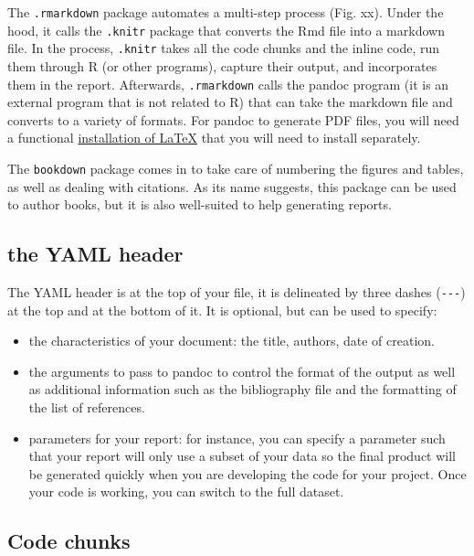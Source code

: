 \documentclass[
]{book}
\providecommand{\tightlist}{%
  \setlength{\itemsep}{0pt}\setlength{\parskip}{0pt}}
\begin{document}
The \texttt{.rmarkdown} package automates a multi-step process (Fig. xx). Under the hood, it calls the \texttt{.knitr} package that converts the Rmd file into a markdown file. In the process, \texttt{.knitr} takes all the code chunks and the inline code, run them through R (or other programs), capture their output, and incorporates them in the report. Afterwards, \texttt{.rmarkdown} calls the pandoc program (it is an external program that is not related to R) that can take the markdown file and converts to a variety of formats. For pandoc to generate PDF files, you will need a functional \href{https://www.latex-project.org/get/}{installation of LaTeX} that you will need to install separately.

The \texttt{bookdown} package comes in to take care of numbering the figures and tables, as well as dealing with citations. As its name suggests, this package can be used to author books, but it is also well-suited to help generating reports.

\hypertarget{the-yaml-header}{%
\subsection{the YAML header}\label{the-yaml-header}}

The YAML header is at the top of your file, it is delineated by three dashes (\texttt{-\/-\/-}) at the top and at the bottom of it. It is optional, but can be used to specify:

\begin{itemize}
\tightlist
\item
  the characteristics of your document: the title, authors, date of creation.
\item
  the arguments to pass to pandoc to control the format of the output as
  well as additional information such as the bibliography file and the
  formatting of the list of references.
\item
  parameters for your report: for instance, you can specify a parameter such that your report will only use a subset of your data so the final product will be generated quickly when you are developing the code for your project. Once your code is working, you can switch to the full dataset.
\end{itemize}

\hypertarget{code-chunks}{%
\subsection{Code chunks}\label{code-chunks}}
\end{document}
